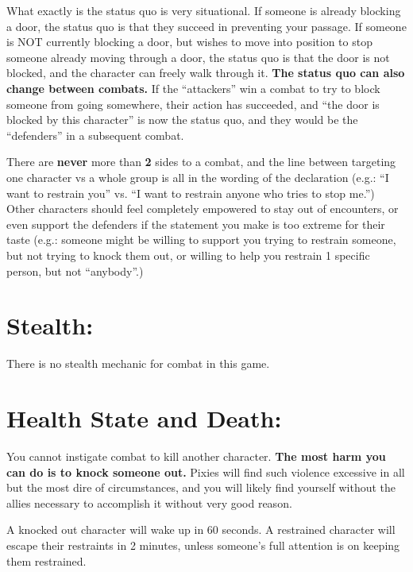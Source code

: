 \documentclass[sheet]{PP}
\begin{document}
What exactly is the status quo is very situational. If someone is already blocking a door, the status quo is that they succeed in preventing your passage. If someone is NOT currently blocking a door, but wishes to move into position to stop someone already moving through a door, the status quo is that the door is not blocked, and the character can freely walk through it. \textbf{The status quo can also change between combats.} If the “attackers” win a combat to try to block someone from going somewhere, their action has succeeded, and “the door is blocked by this character” is now the status quo, and they would be the “defenders” in a subsequent combat.

There are \textbf{never} more than \textbf{2} sides to a combat, and the line between targeting one character vs a whole group is all in the wording of the declaration (e.g.: “I want to restrain you” vs. “I want to restrain anyone who tries to stop me.”) Other characters should feel completely empowered to stay out of encounters, or even support the defenders if the statement you make is too extreme for their taste (e.g.: someone might be willing to support you trying to restrain someone, but not trying to knock them out, or willing to help you restrain 1 specific person, but not “anybody”.)

\section*{Stealth:} There is no stealth mechanic for combat in this game.

\section*{Health State and Death:} You cannot instigate combat to kill another character. \textbf{The most harm you can do is to knock someone out.} Pixies will find such violence excessive in all but the most dire of circumstances, and you will likely find yourself without the allies necessary to accomplish it without very good reason.

A knocked out character will wake up in 60 seconds. A restrained character will escape their restraints in 2 minutes, unless someone's full attention is on keeping them restrained.
\end{document}
